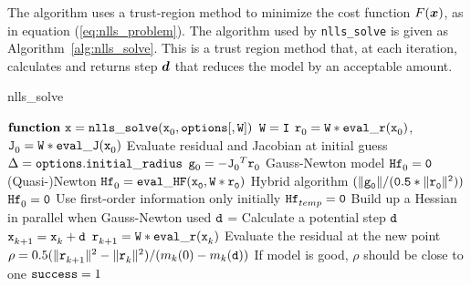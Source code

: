 
The algorithm uses a trust-region method to minimize the cost function
$F(\vx)$, as in equation (\ref{eq:nlls_problem}).  The algorithm used by \texttt{nlls\_solve} is given as Algorithm~\ref{alg:nlls_solve}.  This is a trust region method that, at each iteration, calculates and returns step $\vd$ that reduces the model by an acceptable amount. 

\begin{algorithm}
\caption{nlls\_solve}
\label{alg:nlls_solve}
  \begin{algorithmic}[1]
    \State $ {\tt {\bf function} \  \tx = nlls\_solve}(\iter[0]{\tx},{\tt options[,W]})$
    \State ${\tt W=I}$
    \EndIf
    \State $\iter[0]{\tr} =  {\tt W * eval\_r}(\iter[0]{\tx})$, $\iter[0]{\tJ} = {\tt W * eval\_J}(\iter[0]{\tx})$    
    \Comment Evaluate residual and Jacobian at initial guess
    \State $\Delta = {\tt options\ct initial\_radius}$
    \State $ \iter[0]{\tg} = - {\iter[0]{\tJ}}^T\iter[0]{\tr}$
    \Comment Gauss-Newton model 
    \State $\iter[0]{\thess} = {\tt 0}$
    \Comment (Quasi-)Newton 
    \State $\iter[0]{\thess} = {\tt eval\_HF(\iter[0]{\tx},W * \iter[0]{\tr})}$
    \Comment Hybrid algorithm
    ${\tt (\| \iter[0]{\tg} \| / (0.5 * \|\iter[0]{\tr}\|^2) )}$
    \State $\iter[0]{\thess} = {\tt 0}$
    \Comment Use first-order information only initially
    \State ${\iter[temp]{\thess}} = {\tt 0}$
    \Comment Build up a Hessian in parallel when Gauss-Newton used
    \EndIf
        \State ${\td}$ = 
        \Comment Calculate a potential step $\td$
        \State $\iter[k+1]{\tx} = \iter[k]{\tx} + \td$
        \State $\iter[k+1]{\tr} = {\tt W * eval\_r}(\iter[k]{\tx})$
        \Comment Evaluate the residual at the new point
        \State $\rho = 0.5 (\| \iter[k+1]{\tr} \|^2 - \| \iter[k]{\tr}\|^2)/(m_k(0) - m_k(\td)) $ 
        \Comment If model is good, $\rho$ should be close to one
          \State ${\tt success} = 1$

\end{algorithmic}
\end{algorithm}
